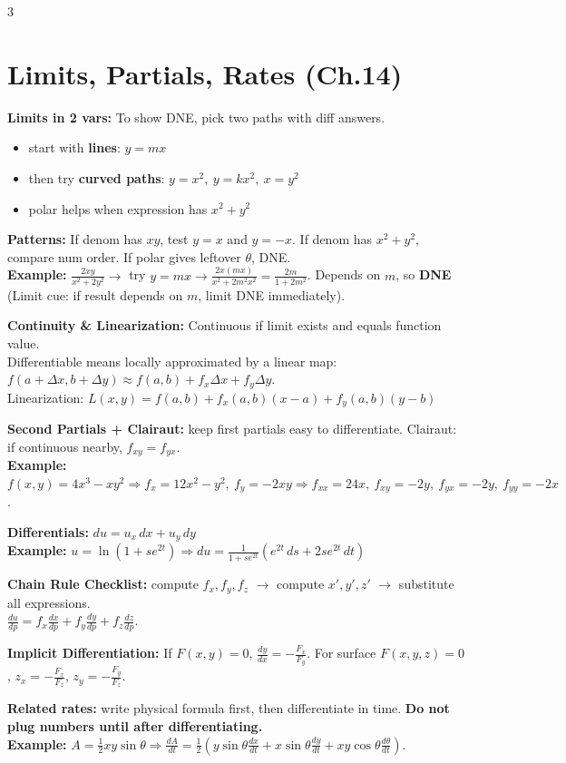 \documentclass[12pt, landscape]{article}
\begin{document}
\begin{multicols}{3}
		\section{Limits, Partials, Rates (Ch.14)}
		\textbf{Limits in 2 vars:} To show DNE, pick two paths with diff answers.
		\begin{itemize}
			\item start with \textbf{lines}: $y=mx$
			\item then try \textbf{curved paths}: $y=x^2,\ y=kx^2,\ x=y^2$
			\item polar helps when expression has $x^2+y^2$
		\end{itemize}
		\textbf{Patterns:} If denom has $xy$, test $y=x$ and $y=-x$. If denom has $x^2+y^2$, compare num order. If polar gives leftover $\theta$, DNE.\\
		\textbf{Example:} $\frac{2xy}{x^2+2y^2} \to$ try $y=mx \to \frac{2x(mx)}{x^2+2m^2x^2}=\frac{2m}{1+2m^2}$. Depends on $m$, so \textbf{DNE} (Limit cue: if result depends on $m$, limit DNE immediately).
		
		\textbf{Continuity \& Linearization:}
		Continuous if limit exists and equals function value.\\
		Differentiable means locally approximated by a linear map: $f(a+\Delta x,b+\Delta y)\approx f(a,b)+f_x\Delta x+f_y\Delta y$.\\
		Linearization: $L(x,y)=f(a,b)+f_x(a,b)(x-a)+f_y(a,b)(y-b)$
		
		\textbf{Second Partials + Clairaut:} keep first partials easy to differentiate. Clairaut: if continuous nearby, $f_{xy}=f_{yx}$.\\
		\textbf{Example:} $f(x,y)=4x^3-xy^2 \Rightarrow f_x=12x^2-y^2,\ f_y=-2xy \Rightarrow f_{xx}=24x,\ f_{xy}=-2y,\ f_{yx}=-2y,\ f_{yy}=-2x$.
		
		\textbf{Differentials:} $du=u_x\,dx+u_y\,dy$\\
		\textbf{Example:} $u=\ln(1+se^{2t}) \Rightarrow du=\frac{1}{1+se^{2t}}\left(e^{2t}\,ds+2se^{2t}\,dt\right)$
		
		\textbf{Chain Rule Checklist:} compute $f_x,f_y,f_z$ $\to$ compute $x',y',z'$ $\to$ substitute all expressions.\\
		$\frac{du}{dp}=f_x\frac{dx}{dp}+f_y\frac{dy}{dp}+f_z\frac{dz}{dp}$.
		
		\textbf{Implicit Differentiation:}
		If $F(x,y)=0$, $\frac{dy}{dx}=-\frac{F_x}{F_y}$.
		For surface $F(x,y,z)=0$, $z_x=-\frac{F_x}{F_z}$, $z_y=-\frac{F_y}{F_z}$.
		
		\textbf{Related rates:} write physical formula first, then differentiate in time. \textbf{Do not plug numbers until after differentiating.}\\
		\textbf{Example:} $A=\frac12xy\sin\theta \Rightarrow \frac{dA}{dt}=\frac12\left(y\sin\theta\frac{dx}{dt} +x\sin\theta\frac{dy}{dt} +xy\cos\theta\frac{d\theta}{dt}\right)$.
		

\end{multicols}
\end{document}
